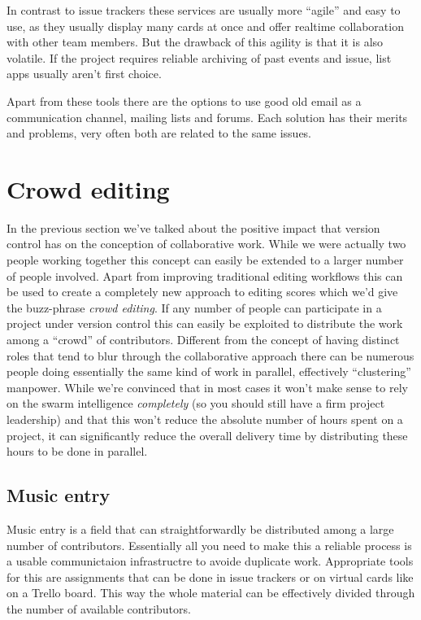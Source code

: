 \documentclass[11pt,a4paper]{article}
\begin{document}
In contrast to issue trackers these services are usually more “agile” and easy to use, as
they usually display many cards at once and offer realtime collaboration with other
team members. But the drawback of this agility is that it is also volatile. If the project
requires reliable archiving of past events and issue, list apps usually aren't first choice.

\medskip
Apart from these tools there are the options to use good old email as a communication channel, mailing lists and forums. Each solution has their merits and problems, very often both are related to the same issues.


\section{Crowd editing}
In the previous section we've talked about the positive impact that version control
has on the conception of collaborative work. While we were actually two people
working together this concept can easily be extended to a larger number of people
involved. Apart from improving traditional editing workflows this can be used to create a
completely new approach to editing scores which we'd give the buzz-phrase \emph{crowd
editing}. If any number of people can participate in a project under version control
this can easily be exploited to distribute the work among a “crowd” of contributors.
Different from the concept of having distinct roles that tend to blur through the
collaborative approach there can be numerous people doing essentially the same kind
of work in parallel, effectively “clustering” manpower. While we're convinced that
in most cases it won't make sense to rely on the swarm intelligence \emph{completely} (so
you should still have a firm project leadership) and that this won't reduce the
absolute number of hours spent on a project, it can significantly reduce the overall
delivery time by distributing these hours to be done in parallel.

\subsection{Music entry}
Music entry is a field that can straightforwardly be distributed among a large number
of contributors. Essentially all you need to make this a reliable process is a usable
communictaion infrastructre to avoide duplicate work.
Appropriate tools for this are assignments that can be done in issue trackers or on
virtual cards like on a Trello board. This way the whole material can be
effectively divided through the number of available contributors.
\end{document}

